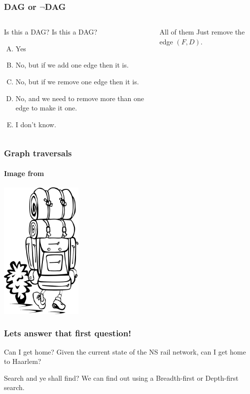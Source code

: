 \begin{frame}
	\frametitle{DAG or $\neg$DAG}
	
	\begin{columns}
			
		\begin{block}{Is this a DAG?}
		\pause
			Is this a DAG?
			\begin{enumerate}[A.]
				\item Yes
				\item No, but if we add one edge then it is.
				\item No, but if we remove one edge then it is.
				\item No, and we need to remove more than one edge to make it one.
				\item I don't know.
			\end{enumerate}
		\end{block}
		\pause
		\vspace{-10pt}
		\begin{block}{All of them}
			Just remove the edge $(F,D)$.
		\end{block}
	\end{columns}
\end{frame}


\begin{frame}
	\frametitle{Graph traversals}
	\framesubtitle{\scriptsize Image from }
	
	\begin{center}
		\includegraphics[width=0.3\textwidth]{images/backpacking.png}\\
	\end{center}
\end{frame}

\begin{frame}
	\frametitle{Lets answer that first question!}

	\begin{block}{Can I get home?}
		Given the current state of the NS rail network, can I get home to Haarlem?
	\end{block}
	\pause
	\begin{block}{Search and ye shall find?}
		We can find out using a Breadth-first or Depth-first search.
	\end{block}
\end{frame}

